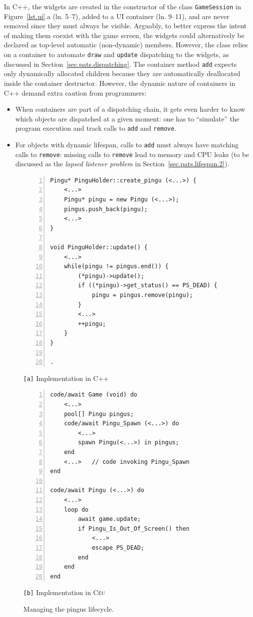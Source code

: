 \documentclass{vgtc}                          %
\newcommand{\CEU}{\textsc{C\'{e}u}\xspace}
\newcommand{\code}[1] {{\small{\texttt{#1}}}}
\newcommand{\ax}{\code{[a]}\xspace}
\newcommand{\bx}{\code{[b]}\xspace}
\begin{document}
In C++, the widgets are created in the constructor of the class
\code{GameSession} in Figure~\ref{lst.ui}.a (ln. 5--7), added to a UI container
(ln. 9--11), and are never removed since they must always be visible.
Arguably, to better express the intent of making them coexist with the game
screen, the widgets could alternatively be declared as top-level automatic
(non-dynamic) members.
However, the class relies on a container to automate \code{draw} and
\code{update} dispatching to the widgets, as discussed in
Section~\ref{sec.pats.dispatching}.
The container method \code{add} expects only dynamically allocated children
because they are automatically deallocated inside the container destructor.
%
However, the dynamic nature of containers in C++ demand extra caution from
programmers:
%
\begin{itemize}
\item When containers are part of a dispatching chain, it gets even harder to
      know which objects are dispatched at a given moment:
      one has to ``simulate'' the program execution and track calls to
      \code{add} and \code{remove}.
\item For objects with dynamic lifespan, calls to \code{add} must always have
      matching calls to \code{remove}:
      missing calls to \code{remove} lead to memory and CPU leaks (to be
      discussed as the \emph{lapsed listener problem} in
      Section~\ref{sec.pats.lifespan.2}).
\end{itemize}

\begin{figure}[t]
\begin{minipage}[t]{0.50\linewidth}
\begin{lstlisting}[numbers=left,xleftmargin=3em]
Pingu* PinguHolder::create_pingu (<...>) {
    <...>
    Pingu* pingu = new Pingu (<...>);
    pingus.push_back(pingu);
    <...>
}

void PinguHolder::update() {
    <...>
    while(pingu != pingus.end()) {
        (*pingu)->update();
        if ((*pingu)->get_status() == PS_DEAD) {
            pingu = pingus.remove(pingu);
        }
        <...>
        ++pingu;
    }
}

.
\end{lstlisting}
\centering\small{\ax Implementation in C++}
\end{minipage}
%
\begin{minipage}[t]{0.50\linewidth}
\begin{lstlisting}[numbers=left,xleftmargin=3em]
code/await Game (void) do
    <...>
    pool[] Pingu pingus;
    code/await Pingu_Spawn (<...>) do
        <...>
        spawn Pingu(<...>) in pingus;
    end
    <...>   // code invoking Pingu_Spawn
end

code/await Pingu (<...>) do
    <...>
    loop do
        await game.update;
        if Pingu_Is_Out_Of_Screen() then
            <...>
            escape PS_DEAD;
        end
    end
end
\end{lstlisting}
\centering\small{\bx Implementation in \CEU}
\end{minipage}
\caption{ Managing the pingus lifecycle.
\label{lst.pingus}
}
\end{figure}
\end{document}
